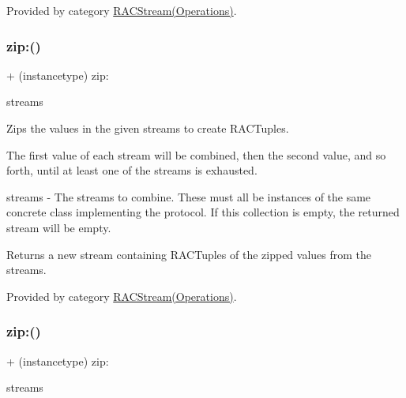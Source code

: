 Provided by category \mbox{\hyperlink{category_r_a_c_stream_07_operations_08_a90ef5f217dc285dc831cc0d45166a529}{R\+A\+C\+Stream(\+Operations)}}.

\mbox{\label{interface_r_a_c_stream_a90ef5f217dc285dc831cc0d45166a529}} 
\subsubsection{\texorpdfstring{zip\+:()}{zip:()}\hspace{0.1cm}{\footnotesize\ttfamily [2/3]}}
{\footnotesize\ttfamily + (instancetype) zip\+: \begin{DoxyParamCaption}\item[{(id$<$ N\+S\+Fast\+Enumeration $>$)}]{streams }\end{DoxyParamCaption}}

Zips the values in the given streams to create R\+A\+C\+Tuples.

The first value of each stream will be combined, then the second value, and so forth, until at least one of the streams is exhausted.

streams -\/ The streams to combine. These must all be instances of the same concrete class implementing the protocol. If this collection is empty, the returned stream will be empty.

Returns a new stream containing R\+A\+C\+Tuples of the zipped values from the streams. 

Provided by category \mbox{\hyperlink{category_r_a_c_stream_07_operations_08_a90ef5f217dc285dc831cc0d45166a529}{R\+A\+C\+Stream(\+Operations)}}.

\mbox{\label{interface_r_a_c_stream_a90ef5f217dc285dc831cc0d45166a529}} 
\subsubsection{\texorpdfstring{zip\+:()}{zip:()}\hspace{0.1cm}{\footnotesize\ttfamily [3/3]}}
{\footnotesize\ttfamily + (instancetype) zip\+: \begin{DoxyParamCaption}\item[{(id$<$N\+S\+Fast\+Enumeration$>$)}]{streams }\end{DoxyParamCaption}}

